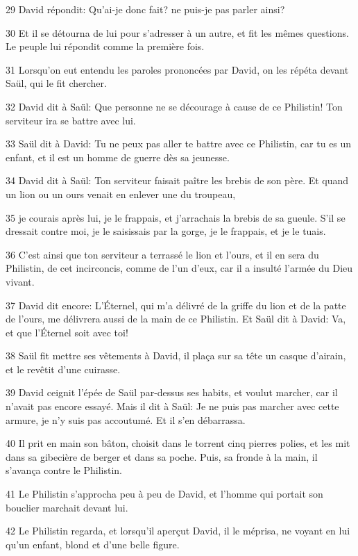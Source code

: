 \par 29 David répondit: Qu'ai-je donc fait? ne puis-je pas parler ainsi?
\par 30 Et il se détourna de lui pour s'adresser à un autre, et fit les mêmes questions. Le peuple lui répondit comme la première fois.
\par 31 Lorsqu'on eut entendu les paroles prononcées par David, on les répéta devant Saül, qui le fit chercher.
\par 32 David dit à Saül: Que personne ne se décourage à cause de ce Philistin! Ton serviteur ira se battre avec lui.
\par 33 Saül dit à David: Tu ne peux pas aller te battre avec ce Philistin, car tu es un enfant, et il est un homme de guerre dès sa jeunesse.
\par 34 David dit à Saül: Ton serviteur faisait paître les brebis de son père. Et quand un lion ou un ours venait en enlever une du troupeau,
\par 35 je courais après lui, je le frappais, et j'arrachais la brebis de sa gueule. S'il se dressait contre moi, je le saisissais par la gorge, je le frappais, et je le tuais.
\par 36 C'est ainsi que ton serviteur a terrassé le lion et l'ours, et il en sera du Philistin, de cet incirconcis, comme de l'un d'eux, car il a insulté l'armée du Dieu vivant.
\par 37 David dit encore: L'Éternel, qui m'a délivré de la griffe du lion et de la patte de l'ours, me délivrera aussi de la main de ce Philistin. Et Saül dit à David: Va, et que l'Éternel soit avec toi!
\par 38 Saül fit mettre ses vêtements à David, il plaça sur sa tête un casque d'airain, et le revêtit d'une cuirasse.
\par 39 David ceignit l'épée de Saül par-dessus ses habits, et voulut marcher, car il n'avait pas encore essayé. Mais il dit à Saül: Je ne puis pas marcher avec cette armure, je n'y suis pas accoutumé. Et il s'en débarrassa.
\par 40 Il prit en main son bâton, choisit dans le torrent cinq pierres polies, et les mit dans sa gibecière de berger et dans sa poche. Puis, sa fronde à la main, il s'avança contre le Philistin.
\par 41 Le Philistin s'approcha peu à peu de David, et l'homme qui portait son bouclier marchait devant lui.
\par 42 Le Philistin regarda, et lorsqu'il aperçut David, il le méprisa, ne voyant en lui qu'un enfant, blond et d'une belle figure.
